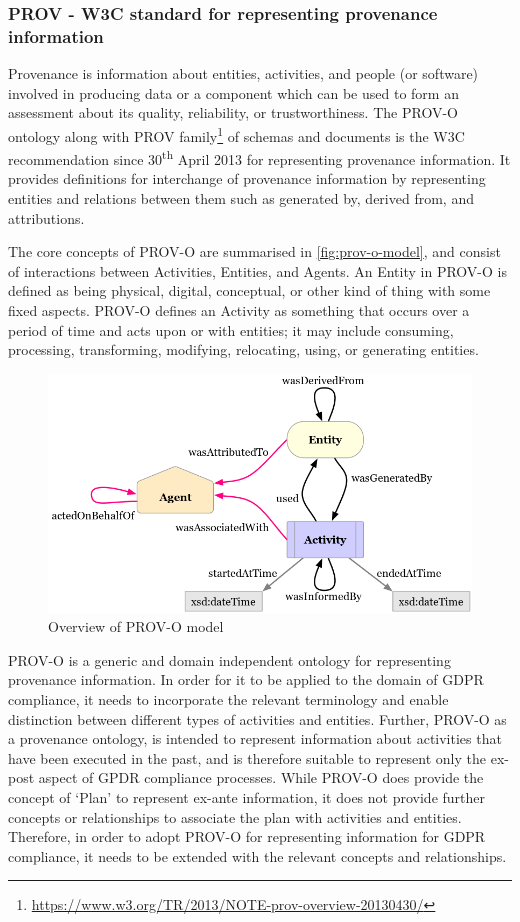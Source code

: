 \subsubsection{PROV - W3C standard for representing provenance information}
Provenance is information about entities, activities, and people (or software)
involved in producing data or a component which can be used to form an
assessment about its quality, reliability, or trustworthiness. The PROV-O ontology \cite{} along with PROV family\footnote{\url{https://www.w3.org/TR/2013/NOTE-prov-overview-20130430/}} of schemas and documents is the W3C recommendation since 30\textsuperscript{th} April 2013 for representing provenance information.
It provides definitions for interchange of provenance information by representing entities
and relations between them such as generated by, derived from, and attributions.

The core concepts of PROV-O are summarised in \autoref{fig:prov-o-model}, and consist of interactions between Activities, Entities, and Agents.
An Entity in PROV-O is defined as being physical, digital, conceptual, or other
kind of thing with some fixed aspects. PROV-O defines an Activity as something
that occurs over a period of time and acts upon or with entities; it may include
consuming, processing, transforming, modifying, relocating, using, or generating
entities.
\begin{figure}[htbp]
    \centering
    \includegraphics[width=\linewidth]{img/prov-o-model.png}
    \caption{Overview of PROV-O model \cite{}}
    \label{fig:prov-o-model}
\end{figure}

PROV-O is a generic and domain independent ontology for representing provenance information.
In order for it to be applied to the domain of GDPR compliance, it needs to incorporate the relevant terminology and enable distinction between different types of activities and entities.
Further, PROV-O as a provenance ontology, is intended to represent information about activities that have been executed in the past, and is therefore suitable to represent only the ex-post aspect of GPDR compliance processes.
While PROV-O does provide the concept of `Plan' to represent ex-ante information, it does not provide further concepts or relationships to associate the plan with activities and entities.
Therefore, in order to adopt PROV-O for representing information for GDPR compliance, it needs to be extended with the relevant concepts and relationships.

